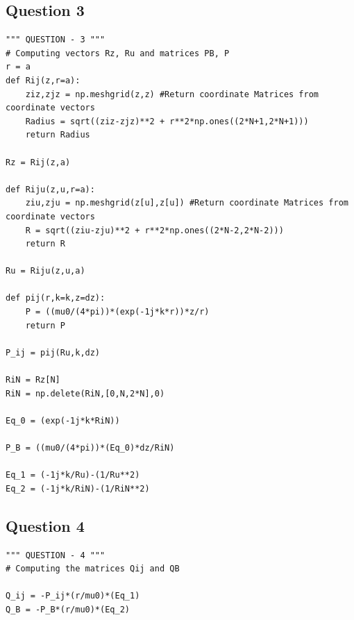 \documentclass[11pt,a4paper]{article}
\begin{document}
\subsection{Question 3}
\lstset{language=Python}
\lstset{frame=lines}
\lstset{basicstyle=\footnotesize}
\begin{lstlisting}
""" QUESTION - 3 """
# Computing vectors Rz, Ru and matrices PB, P
r = a
def Rij(z,r=a):
	ziz,zjz = np.meshgrid(z,z) #Return coordinate Matrices from coordinate vectors
	Radius = sqrt((ziz-zjz)**2 + r**2*np.ones((2*N+1,2*N+1)))
	return Radius

Rz = Rij(z,a)

def Riju(z,u,r=a):
	ziu,zju = np.meshgrid(z[u],z[u]) #Return coordinate Matrices from coordinate vectors
	R = sqrt((ziu-zju)**2 + r**2*np.ones((2*N-2,2*N-2)))
	return R
	
Ru = Riju(z,u,a)

def pij(r,k=k,z=dz):
	P = ((mu0/(4*pi))*(exp(-1j*k*r))*z/r)
	return P
	
P_ij = pij(Ru,k,dz)

RiN = Rz[N]
RiN = np.delete(RiN,[0,N,2*N],0)

Eq_0 = (exp(-1j*k*RiN))

P_B = ((mu0/(4*pi))*(Eq_0)*dz/RiN)

Eq_1 = (-1j*k/Ru)-(1/Ru**2)
Eq_2 = (-1j*k/RiN)-(1/RiN**2)
\end{lstlisting}

\subsection{Question 4}
\lstset{language=Python}
\lstset{frame=lines}
\lstset{basicstyle=\footnotesize}
\begin{lstlisting}
""" QUESTION - 4 """
# Computing the matrices Qij and QB

Q_ij = -P_ij*(r/mu0)*(Eq_1)
Q_B = -P_B*(r/mu0)*(Eq_2)
\end{lstlisting}
\end{document}
